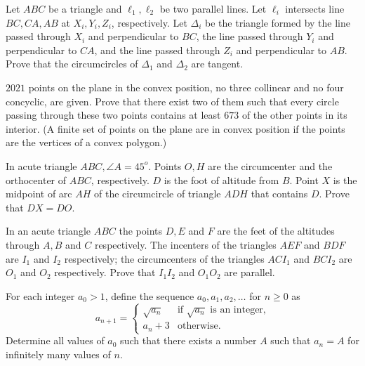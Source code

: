 \documentclass[11pt]{scrartcl}
\begin{document}
\begin{problem}[4992489807901310938]
Let $ABC$ be a triangle and $\ell_1,\ell_2$ be two parallel lines. Let $\ell_i$ intersects line $BC,CA,AB$ at $X_i,Y_i,Z_i$, respectively. Let $\Delta_i$ be the triangle formed by the line passed through $X_i$ and perpendicular to $BC$, the line passed through $Y_i$ and perpendicular to $CA$, and the line passed through $Z_i$ and perpendicular to $AB$. Prove that the circumcircles of $\Delta_1$ and $\Delta_2$ are tangent.
\end{problem}
\begin{problem}[8700346175921432509]
$2021$ points on the plane in the convex position, no three collinear and no four concyclic, are given. Prove that there exist two of them such that every circle passing through these two points contains at least $673$ of the other points in its interior.
(A finite set of points on the plane are in convex position if the points are the vertices of a convex polygon.)
\end{problem}
\begin{problem}[7384014966956792204]
	In acute triangle $ABC, \angle A = 45^o$. Points $O,H$ are the circumcenter and the orthocenter of $ABC$, respectively. $D$ is the foot of altitude from $B$. Point $X$ is the midpoint of arc $AH$ of the circumcircle of triangle $ADH$ that contains $D$. Prove that $DX = DO$.
\end{problem}
\begin{problem}[6195404266254375127]
	In an acute triangle $ABC$ the points $D,E$ and $F$ are the feet of the altitudes through $A,B$ and $C$ respectively. The incenters of the triangles $AEF$ and $BDF$ are $I_1$ and $I_2$ respectively; the circumcenters of the triangles $ACI_1$ and $BCI_2$ are $O_1$ and $O_2$ respectively. Prove that $I_1I_2$ and $O_1O_2$ are parallel.
\end{problem}
\begin{problem}[552612087321706]
For each integer $a_0 > 1$, define the sequence $a_0, a_1, a_2, \ldots$ for $n \geq 0$ as
$$a_{n+1} = 
\begin{cases}
\sqrt{a_n} & \text{if } \sqrt{a_n} \text{ is an integer,} \\
a_n + 3 & \text{otherwise.}
\end{cases}
$$Determine all values of $a_0$ such that there exists a number $A$ such that $a_n = A$ for infinitely many values of $n$.
\end{problem}
\end{document}
